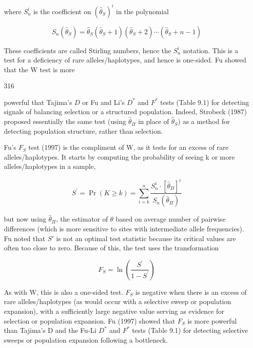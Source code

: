 \documentclass{article}
\begin{document}
where  $ S_{n}^{i} $ is the coefficient on  $ (\widehat{\theta}_{S})^{i} $ in the polynomial

\begin{equation}
S_{n}(\widehat{\theta}_{S})=\widehat{\theta}_{S}(\widehat{\theta}_{S}+1)(\widehat{\theta}_{S}+2)\cdots(\widehat{\theta}_{S}+n-1)
\end{equation}

These coefficients are called Stirling numbers, hence the  $ S_n^i $ notation. This is a test for a deficiency of rare alleles/haplotypes, and hence is one-sided. Fu showed that the W test is more

316

powerful that Tajima’s $D$ or Fu and Li’s $D^{*}$ and $F^{*}$ tests (Table 9.1) for detecting signals of balancing selection or a structured population. Indeed, Strobeck (1987) proposed essentially the same test (using $\widehat{\theta}_{\Pi}$ in place of $\widehat{\theta}_{S}$) as a method for detecting population structure, rather than selection.

Fu's  $ F_{S} $ test (1997) is the compliment of W, as it tests for an excess of rare alleles/haplotypes. It starts by computing the probability of seeing k or more alleles/haplotypes in a sample,

\begin{equation}
S^{\prime}=\Pr(K\geq k)=\sum_{i=k}^{n}\frac{S_{n}^{i}\cdot[\widehat{\theta}_{\Pi}]^{i}}{S_{n}(\widehat{\theta}_{\Pi})}
\tag{9.33a}
\label{eq:9_33a}
\end{equation}

but now using  $ \hat{\theta}_{\Pi} $, the estimator of  $ \theta $ based on average number of pairwise differences (which is more sensitive to sites with intermediate allele frequencies). Fu noted that  $ S' $ is not an optimal test statistic because its critical values are often too close to zero. Because of this, the test uses the transformation

\begin{equation}
F_{S}=\ln\left(\frac{S^{\prime}}{1-S^{\prime}}\right)
\tag{9.33b}
\label{eq:9_33b}
\end{equation}

As with W, this is also a one-sided test.  $ F_S $ is negative when there is an excess of rare alleles/haplotypes (as would occur with a selective sweep or population expansion), with a sufficiently large negative value serving as evidence for selection or population expansion. Fu (1997) showed that  $ F_S $ is more powerful than Tajima's D and the Fu-Li  $ D^* $ and  $ F^* $ tests (Table 9.1) for detecting selective sweeps or population expansion following a bottleneck.
\end{document}
